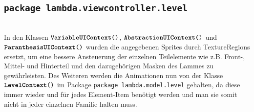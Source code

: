 \subsection{\texttt{package lambda.viewcontroller.level}}

\item[Allgemein] \hfill \\ In den Klassen $\texttt{\textbf{VariableUIContext}()}$, $\texttt{\textbf{AbstractionUIContext}()}$ und $\texttt{\textbf{ParanthesisUIContext}()}$ wurden die angegebenen Sprites durch TextureRegions ersetzt, um eine bessere Ansteuerung der einzelnen Teilelemente wie z.B. Front-, Mittel- und Hinterteil und den dazugehörigen Masken des Lammes zu gewährleisten. Des Weiteren werden die Animationen nun von der Klasse $\texttt{\textbf{LevelContext}()}$ im Package \texttt{package lambda.model.level} gehalten, da diese immer wieder und für jedes Element-Item benötigt werden und man sie somit nicht in jeder einzelnen Familie halten muss.

